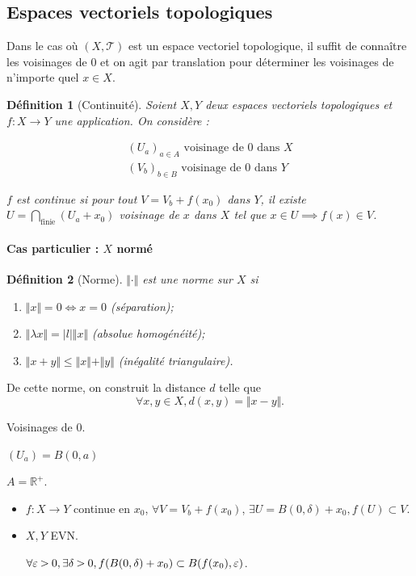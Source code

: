 \documentclass[french]{book}
\newtheorem{definition}{Définition}[section]
\newcommand{\biggg}{\rotatebox[origin=c]{90}{$\lor$}}
\newcommand{\bg}{\ \biggg\ }
\begin{document}
\subsection{Espaces vectoriels topologiques}

Dans le cas où $(X, \mathscr{T} )$ est un espace vectoriel topologique, il suffit de connaître les voisinages de 0 et on agit par translation pour déterminer les voisinages de n'importe quel $x \in X$.

\begin{definition}[Continuité]
  Soient $X, Y$ deux espaces vectoriels topologiques et $f: X \to Y$ une application. On considère :

  \begin{gather*}
    (U_a) _{a \in A} \text{ voisinage de } 0 \text{ dans } X \\
    (V_b) _{b \in B} \text{ voisinage de } 0 \text{ dans  } Y
  \end{gather*}

  $f$ est continue si pour tout $V = V_b + f(x_0)$ dans $Y$, il existe $U = \bigcap_{\text{finie} } (U_a +x_0) $ voisinage de $x$ dans $X$ tel que $x \in U \implies f(x) \in V$.
\end{definition}

\paragraph{Cas particulier : $X$ normé}

\begin{definition}[Norme]
  $\Vert \cdot \Vert $ est une norme sur $X$ si

  \begin{enumerate}
    \item $\Vert x \Vert = 0 \iff x=0 $ (séparation);
    \item $\Vert \lambda x \Vert = \lvert l \rvert \Vert x \Vert $ (absolue homogénéité);
    \item $\Vert x+y \Vert \leq \Vert x \Vert + \Vert y \Vert $ (inégalité triangulaire).
  \end{enumerate}
\end{definition}

De cette norme, on construit la distance $d$ telle que $$\forall x, y \in X, d(x,y) = \Vert x-y \Vert.$$

Voisinages de 0.

$(U_a) = B(0, a)$

$A = \mathbb{R} ^{+}$.

\begin{itemize}
  \item $f: X \to Y$ continue en $x_0$, $\forall V = V_b + f(x_0)$, $\exists U = B(0, \delta ) + x_0 , f(U) \subset V$.
  \item $X, Y$ EVN.

  $\forall \varepsilon  \bg 0, \exists \delta  \bg 0, f(B(0, \delta ) + x_0) \subset B(f(x_0), \varepsilon )$.
\end{itemize}
\end{document}
